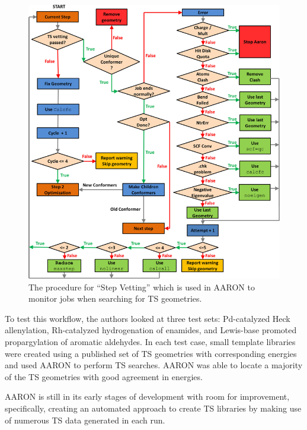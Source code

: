\documentclass[preprint, 11pt]{elsarticle} %
\begin{document}
\begin{figure}
    \centering
    \includegraphics[width=\textwidth]{aaron_exception}
    \caption{The procedure for ``Step Vetting'' which is used in AARON to monitor jobs when searching for TS geometries.}
    \label{fig:aaron_exception}
\end{figure}

To test this workflow, the authors looked at three test sets: Pd-catalyzed Heck allenylation, Rh-catalyzed hydrogenation of enamides, and Lewis-base promoted propargylation of aromatic aldehydes.
In each test case, small template libraries were created using a published set of TS geometries with corresponding energies and used AARON to perform TS searches.
AARON was able to locate a majority of the TS geometries with good agreement in energies.

AARON is still in its early stages of development with room for improvement, specifically, creating an automated approach to create TS libraries by making use of numerous TS data generated in each run.


\end{document}
